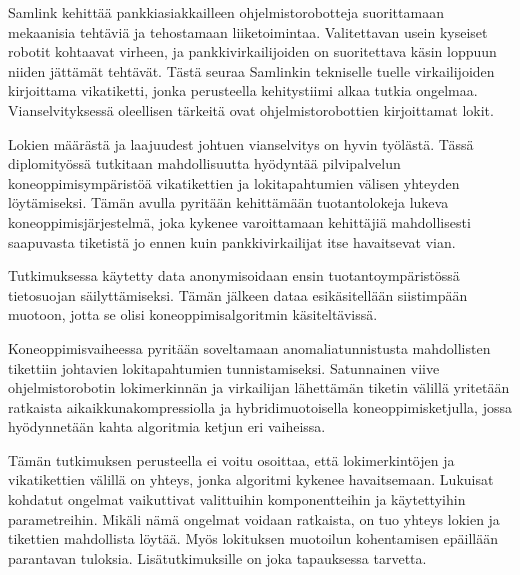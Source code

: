 \documentclass[english, 12pt, a4paper, elec, utf8, a-1b, online]{aaltothesis}
\begin{document}

\newpage
\begin{abstractpage}[finnish]
  Samlink kehittää pankkiasiakkailleen ohjelmistorobotteja
  suorittamaan mekaanisia tehtäviä ja tehostamaan liiketoimintaa.
  Valitettavan usein kyseiset robotit kohtaavat virheen,
  ja pankkivirkailijoiden on suoritettava käsin loppuun
  niiden jättämät tehtävät.
  Tästä seuraa Samlinkin tekniselle tuelle virkailijoiden kirjoittama vikatiketti,
  jonka perusteella kehitystiimi alkaa tutkia ongelmaa.
  Vianselvityksessä oleellisen tärkeitä ovat ohjelmistorobottien kirjoittamat lokit.

  Lokien määrästä ja laajuudest johtuen
  vianselvitys on hyvin työlästä.
  Tässä diplomityössä tutkitaan mahdollisuutta
  hyödyntää pilvipalvelun koneoppimisympäristöä
  vikatikettien ja lokitapahtumien välisen yhteyden löytämiseksi.
  Tämän avulla pyritään kehittämään tuotantolokeja lukeva koneoppimisjärjestelmä,
  joka kykenee varoittamaan kehittäjiä mahdollisesti saapuvasta tiketistä
  jo ennen kuin pankkivirkailijat itse havaitsevat vian.

  Tutkimuksessa käytetty data anonymisoidaan ensin tuotantoympäristössä
  tietosuojan säilyttämiseksi.
  Tämän jälkeen dataa esikäsitellään siistimpään muotoon,
  jotta se olisi koneoppimisalgoritmin käsiteltävissä.

  Koneoppimisvaiheessa pyritään soveltamaan anomaliatunnistusta
  mahdollisten tikettiin johtavien lokitapahtumien tunnistamiseksi.
  Satunnainen viive ohjelmistorobotin lokimerkinnän ja virkailijan lähettämän tiketin välillä
  yritetään ratkaista aikaikkunakompressiolla ja hybridimuotoisella koneoppimisketjulla,
  jossa hyödynnetään kahta algoritmia ketjun eri vaiheissa.

  Tämän tutkimuksen perusteella ei voitu osoittaa,
  että lokimerkintöjen ja vikatikettien välillä on yhteys,
  jonka algoritmi kykenee havaitsemaan.
  Lukuisat kohdatut ongelmat vaikuttivat valittuihin komponentteihin
  ja käytettyihin parametreihin.
  Mikäli nämä ongelmat voidaan ratkaista,
  on tuo yhteys lokien ja tikettien mahdollista löytää.
  Myös lokituksen muotoilun kohentamisen epäillään parantavan tuloksia.
  Lisätutkimuksille on joka tapauksessa tarvetta.
\end{abstractpage}
\end{document}
